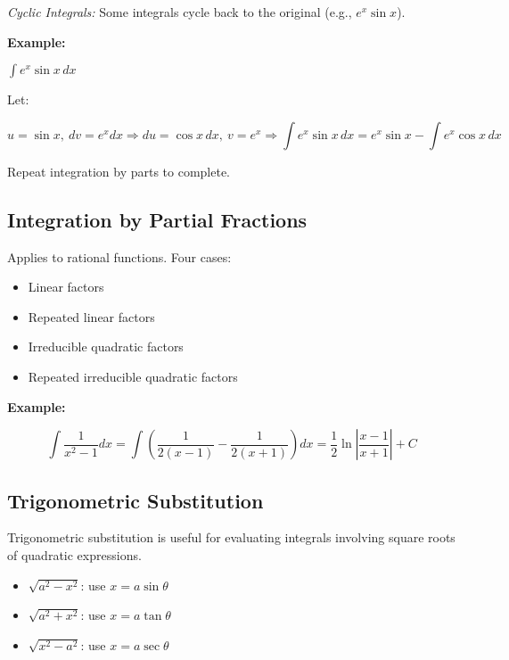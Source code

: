\emph{Cyclic Integrals:} Some integrals cycle back to the original (e.g., \(e^x \sin x\)).

\textbf{Example:}

 \(\int e^x \sin x\,dx\)

Let:

\[
    u = \sin x,\ dv = e^x dx \Rightarrow du = \cos x\,dx,\ v = e^x
    \Rightarrow \int e^x \sin x\,dx = e^x \sin x - \int e^x \cos x\,dx
\]

Repeat integration by parts to complete.

\subsection{Integration by Partial Fractions}

Applies to rational functions. Four cases:

\begin{itemize}

    \item Linear factors

    \item Repeated linear factors

    \item Irreducible quadratic factors

    \item Repeated irreducible quadratic factors

\end{itemize}

\textbf{Example:}

\[
    \int \frac{1}{x^2 - 1} dx = \int \left( \frac{1}{2(x - 1)} - \frac{1}{2(x + 1)} \right) dx 
    = \frac{1}{2} \ln\left|\frac{x - 1}{x + 1}\right| + C
\]

\subsection{Trigonometric Substitution}

Trigonometric substitution is useful for evaluating integrals involving square roots of quadratic 
expressions.

\begin{itemize}

    \item \(\sqrt{a^2 - x^2}\): use \(x = a \sin \theta\)

    \item \(\sqrt{a^2 + x^2}\): use \(x = a \tan \theta\)

    \item \(\sqrt{x^2 - a^2}\): use \(x = a \sec \theta\)

\end{itemize}

